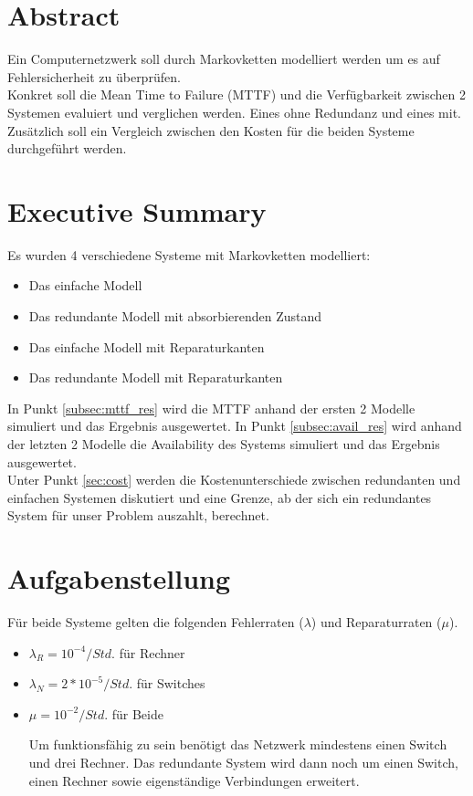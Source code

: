 \documentclass[10pt,a4paper]{article}
\begin{document}


\newpage
\section{Abstract}
Ein Computernetzwerk soll durch Markovketten modelliert werden um es auf Fehlersicherheit zu überprüfen.
\\ 
Konkret soll die Mean Time to Failure (MTTF) und die Verfügbarkeit zwischen 2 Systemen evaluiert und verglichen werden. Eines ohne Redundanz und eines mit.
Zusätzlich soll ein Vergleich zwischen den Kosten für die beiden Systeme durchgeführt werden.

\section{Executive Summary}
Es wurden 4 verschiedene Systeme mit Markovketten modelliert:
\begin{itemize}
	\item Das einfache Modell
	\item Das redundante Modell mit absorbierenden Zustand
	\item Das einfache Modell mit Reparaturkanten
	\item Das redundante Modell mit Reparaturkanten
\end{itemize}
In Punkt \ref{subsec:mttf_res} wird die MTTF anhand der ersten 2 Modelle simuliert und das Ergebnis ausgewertet. In Punkt \ref{subsec:avail_res} wird anhand der letzten 2 Modelle die Availability des Systems simuliert und das Ergebnis ausgewertet. \\
Unter Punkt \ref{sec:cost} werden die Kostenunterschiede zwischen redundanten und einfachen Systemen diskutiert und eine Grenze, ab der sich ein redundantes System für unser Problem auszahlt, berechnet.
\newpage
\section{Aufgabenstellung}
Für beide Systeme gelten die folgenden Fehlerraten ($\lambda$) und Reparaturraten ($\mu$).
\begin{itemize}
	\item $\lambda_R=10^{-4}/Std.$ für Rechner
	\item $\lambda_N=2*10^{-5}/Std.$ für Switches
	\item  $\mu=10^{-2}/Std. $ für Beide
	
Um funktionsfähig zu sein benötigt das Netzwerk mindestens einen Switch und drei Rechner.
Das redundante System wird dann noch um einen Switch, einen Rechner sowie eigenständige Verbindungen erweitert. \\

\end{itemize}
\end{document}

